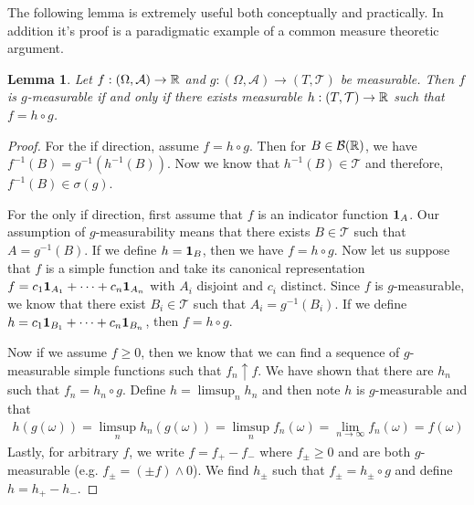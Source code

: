 \documentclass{amsart}
\newtheorem{lem}[thm]{Lemma}
\theoremstyle{remark}
\theoremstyle{definition}
\begin{document}
The following lemma is extremely useful both conceptually and
practically.  In addition it's proof is a paradigmatic example of a
common measure theoretic argument.
\begin{lem}\label{FunctionalRepresentation}Let $f : (\Omega, \mathcal{A}) \to \mathbb{R}$ and $g :
  (\Omega, \mathcal{A}) \to (T,\mathcal{T})$ be measurable.  Then $f$
  is $g$-measurable if and only if there exists measurable $h :
  (T,\mathcal{T}) \to \mathbb{R}$ such that $f = h \circ g$.
\end{lem}
\begin{proof}
For the if direction, assume $f = h \circ g$.  Then for $B \in
\mathcal{B}(\mathbb{R})$, we have $f^{-1}(B) = g^{-1}(h^{-1}(B))$.  Now we know
that $h^{-1}(B) \in \mathcal{T}$ and therefore, $f^{-1}(B) \in
\sigma(g)$.

For the only if direction, first assume that $f$ is an indicator
function $\textbf{1}_{A}$.  Our assumption of $g$-measurability
means that there exists $B \in \mathcal{T}$ such that $A =
g^{-1}(B)$.  If we define $h = \textbf{1}_{B}$, then we have $f =
h \circ g$.  Now let us suppose that $f$ is a simple function and take
its canonical representation $f = c_1 \textbf{1}_{A_1} + \cdots + c_n
\textbf{1}_{A_n}$ with $A_i$ disjoint and $c_i$ distinct.  Since $f$ is
$g$-measurable, we know that there exist $B_i \in \mathcal{T}$ such
that $A_i = g^{-1}(B_i)$.  If we define $h=c_1 \textbf{1}_{B_1} + \cdots + c_n
\textbf{1}_{B_n}$, then $f = h \circ g$.

Now if we assume $f \geq 0$, then we know that we can find a sequence
of $g$-measurable simple functions such that $f_n \uparrow f$.  We
have shown that there are $h_n$ such that $f_n = h_n \circ g$.  Define
$h = \limsup_n h_n$ and then note $h$ is $g$-measurable and that 
\begin{align*}
h(g(\omega)) = \limsup_n h_n(g(\omega)) = \limsup_n f_n(\omega) =
\lim_{n \to \infty} f_n(\omega) = f(\omega)
\end{align*}
Lastly, for arbitrary $f$, we write $f = f_+ - f_{-}$ where $f_{\pm}
\geq 0$ and are both $g$-measurable (e.g. $f_{\pm} = (\pm f) \wedge 0$).
We find $h_{\pm}$ such that $f_{\pm} = h_{\pm} \circ g$ and define $h = h_+ - h_{-}$.
\end{proof}
\end{document}
